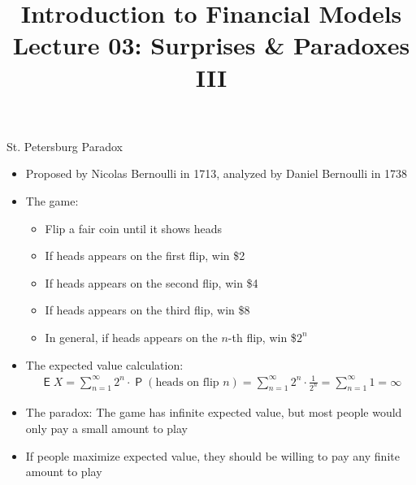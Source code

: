 \documentclass[10pt]{beamer}
\title{Introduction to Financial Models \\ Lecture 03: Surprises \& Paradoxes III}
\author{}
\date{}
\DeclareMathOperator\prb{\mathsf{P}}
\DeclareMathOperator\expc{\mathsf{E}}
\begin{document}
\begin{frame}
\titlepage
\end{frame}


\begin{frame}{St. Petersburg Paradox}
  \begin{itemize}[<+->]
    \item Proposed by Nicolas Bernoulli in 1713, analyzed by Daniel Bernoulli in 1738
    \item The game:
      \begin{itemize}
        \item Flip a fair coin until it shows heads
        \item If heads appears on the first flip, win \$2
        \item If heads appears on the second flip, win \$4
        \item If heads appears on the third flip, win \$8
        \item In general, if heads appears on the $n$-th flip, win \$$2^n$
      \end{itemize}
    \item The expected value calculation:
      \begin{align*}
        \expc{X} = \sum_{n=1}^{\infty} 2^n \cdot \prb(\text{heads on flip } n) = \sum_{n=1}^{\infty} 2^n \cdot \frac{1}{2^n} = \sum_{n=1}^{\infty} 1 = \infty
      \end{align*}
    \item The paradox: The game has infinite expected value, but most people would only pay a small amount to play
    \item If people maximize expected value, they should be willing to pay any finite amount to play
  \end{itemize}
\end{frame}
\end{document}
